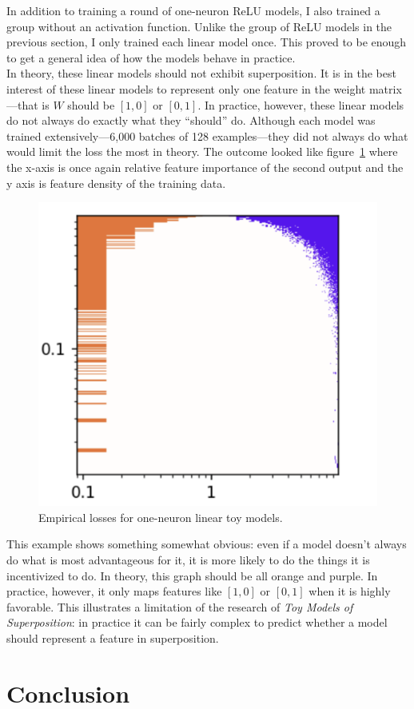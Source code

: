 \documentclass{article} %
\begin{document}
In addition to training a round of one-neuron ReLU models, I also trained a group
without an activation function. Unlike the group of ReLU models in the previous
section, I only trained each linear model once. This proved to be enough to get
a general idea of how the models behave in practice. \\

In theory, these linear models should not exhibit superposition. It is in the best
interest of these linear models to represent only one feature in the weight matrix---that 
is $W$ should be $[1,0]$ or $[0, 1]$. In practice, however,
these linear models do not always do exactly what they ``should'' do. Although each model was trained
extensively---6,000 batches of 128 examples---they did not always do what would
limit the loss the most in theory. The outcome looked like 
figure~\ref{fig:linear_phases} where the x-axis is once again relative feature
importance of the second output and the y axis is feature density of the training
data.

\begin{figure}[h]
    \centering
    \includegraphics[width=0.25\linewidth]{phase_changes/images/linear_phases.png}
    \captionsetup{font=footnotesize, width=0.7\linewidth} %
    \caption{
        Empirical losses for one-neuron linear toy models.
    }
    \label{fig:linear_phases}
\end{figure}

This example shows something somewhat obvious: even if a model doesn't always do
what is most advantageous for it, it is more likely to do the things it
is incentivized to do. In theory, this graph should be all orange and purple. In
practice, however, it only maps features like $[1, 0]$ or $[0, 1]$ when it is
highly favorable. This illustrates a limitation of the research of \textit{Toy 
Models of Superposition}: in practice it can be fairly complex to predict whether
a model should represent a feature in superposition.

\section{Conclusion}
\end{document}
